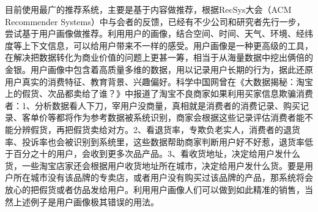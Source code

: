 	目前使用最广的推荐系统，主要是基于内容做推荐，根据RecSys大会（ACM Recommender Systems）中与会者的反馈，已经有不少公司和研究者先行一步，尝试基于用户画像做推荐。利用用户的画像，结合空间、时间、天气、环境、经纬度等上下文信息，可以给用户带来不一样的感受。用户画像是一种更高级的工具，在解决把数据转化为商业价值的问题上更甚一筹，相当于从海量数据中挖出俩倍的金银。用户画像中包含着高质量多维的数据，用以记录用户长期的行为，据此还原用户真实的消费特征、教育背景、兴趣偏好。科学中国网曾在《大数据揭秘：淘宝上的假货、次品都卖给了谁？》中报道了淘宝不良商家如果利用买家信息欺骗消费者\citep{liar_taobao}：1、分析数据看人下刀，宰用户没商量，真相就是消费者的消费记录、购买记录、客单价等都将作为参考数据被系统识别，商家会根据这些记录评估消费者能不能分辨假货，再把假货卖给对方。2、看退货率，专欺负老实人，消费者的退货率、投诉率也会被识别到系统里，这些数据帮助商家判断用户好不好惹，退货率低于百分之十的用户，会收到更多次品产品。3、看收货地址，决定给用户发什么货，一些淘宝店家还会根据用户收货地址所在城市，决定给用户发什么货。要是用户所在城市没有该品牌的专卖店，或者用户没有购买过该品牌的产品，那系统将会放心的把假货或者仿品发给用户。利用用户画像人们可以做到如此精准的销售，当然上述例子是用户画像极其错误的用法。
